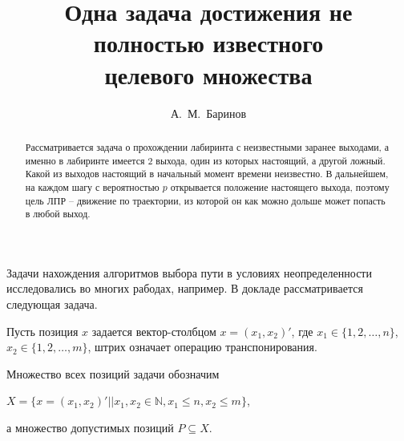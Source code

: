 \title{Одна задача достижения не полностью известного\\ целевого множества}%
\author{А.~М.~Баринов
}


\maketitle

\begin{abstract}
Рассматривается задача о прохождении лабиринта с неизвестными заранее выходами, а именно в лабиринте имеется $2$ выхода, один из которых настоящий, а другой ложный. Какой из выходов настоящий в начальный момент времени неизвестно. В дальнейшем, на каждом шагу с вероятностью $p$ открывается положение настоящего выхода, поэтому цель ЛПР --  движение по траектории, из которой он как можно дольше может попасть в любой выход.

\end{abstract}


Задачи нахождения алгоритмов выбора пути в условиях неопределенности исследовались во многих рабодах, например\cite{bar1,bar2}. В докладе рассматривается следующая задача.

Пусть позиция $x$ задается вектор-столбцом $x=(x_1,x_2)'$, где $x_1\in \{1,2,\ldots,n\}$,\\  $x_2\in \{1,2,\ldots,m\}$, штрих означает операцию  транспонирования.

Множество всех позиций задачи обозначим
\begin{center}
 $X=\{x=(x_1,x_2)' || x_1, x_2\in \mathbb{N}, x_1\leq n, x_2\leq m\}$,
\end{center}
а множество допустимых позиций $P \subseteq X$.

